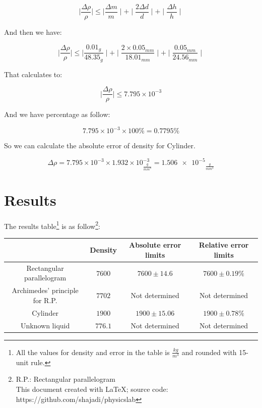 \documentclass[a4paper, 12pt]{article}
\begin{document}
\[
\mid\frac{\varDelta\rho}{\rho}\mid \leqslant \mid\frac{\varDelta m}{m}\mid + \mid\frac{2\varDelta d}{d}\mid + \mid\frac{\varDelta h}{h}\mid 
\]

And then we have:

\[
\mid\frac{\varDelta\rho}{\rho}\mid \leqslant \mid\frac{0.01_{g}}{48.35_{g}}\mid + \mid\frac{2 \times 0.05_{mm}}{18.01_{mm}}\mid + \mid\frac{0.05_{mm}}{24.56_{mm}}\mid 
\]

That calculates to:

\[
\mid\frac{\varDelta\rho}{\rho}\mid \leqslant 7.795\times10^{-3}
\]

And we have percentage as follow:

\[
7.795\times10^{-3} \times 100\% = 0.7795\% 
\]

So we can calculate the absolute error of density for Cylinder.

\[
\varDelta \rho = 7.795\times10^{-3} \times 1.932\times10^{-3}_{\frac{g}{mm^{3}}} = \num{1.506e-5}_{\frac{g}{mm^{3}}}
\]

\clearpage

\section{Results}

The results table\footnote{All the values for density and error in the table is \(\frac{kg}{m^{3}} \) and rounded with 15-unit rule.} is as follow\footnote{R.P.: Rectangular parallelogram \\
This document created with \LaTeX; source code: https://github.com/shajadi/physicslab }:

\begin{center}
	\begin{tabular}{||c c c c||} 
		\hline
		&  Density & Absolute error limits  &  Relative error limits  \\ [0.5ex] 
		\hline\hline
		Rectangular parallelogram & \(7600\) & \(7600 \pm  14.6 \)  & \(7600 \pm 0.19\% \) \\ 
		\hline
		Archimedes’ principle for R.P. & \(7702\) & Not determined & Not determined \\
		\hline
		Cylinder & \(1900\) & \(1900 \pm 15.06 \) & \(1900 \pm 0.78\% \) \\
		\hline
		Unknown liquid & \(776.1\) & Not determined &  Not determined \\ [1ex] 
		\hline
	\end{tabular}
\end{center}
\end{document}
